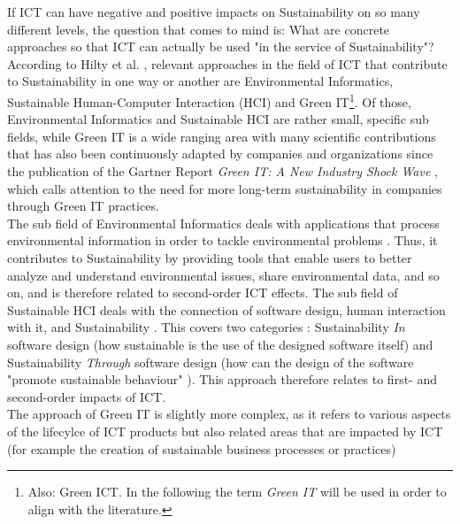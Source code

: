 \documentclass[oribibl]{llncs}
\begin{document}
If ICT can have negative and positive impacts on Sustainability on so many different levels, the question that comes to mind is: What are concrete approaches so that ICT can actually be used "in the service of Sustainability"\cite{hilty11}?\\
According to Hilty et al. \cite{hilty11}, relevant approaches in the field of ICT that contribute to Sustainability in one way or another  are Environmental Informatics, Sustainable Human-Computer Interaction (HCI) %
and Green IT\footnote{Also: Green ICT. In the following the term \textit{Green IT} will be used in order to align with the literature.}. %
Of those, Environmental Informatics and Sustainable HCI are rather small, specific sub fields, while Green IT is a wide ranging area with many scientific contributions that has also been continuously adapted by companies and organizations %
since the publication of the Gartner Report \textit{Green IT: A New Industry Shock Wave} \cite{gartner07}, which calls attention to the need for more long-term sustainability in companies through Green IT practices.\\ %
The sub field of Environmental Informatics deals with
applications that process environmental information in order to tackle environmental problems \cite{hilty11}. Thus, it contributes to Sustainability by providing tools that enable users to better analyze and understand environmental issues, share environmental data, and so on, and is therefore related to second-order ICT effects. The sub field of Sustainable HCI deals with the connection of software design, human interaction with it, and Sustainability \cite{hilty11}. This covers two categories \cite{hilty11}: Sustainability \textit{In} software design (how sustainable is the use of the designed software itself) and Sustainability \textit{Through} software design (how can the design of the software "promote sustainable behaviour" \cite{hilty11}). This approach therefore relates to first- and second-order impacts of ICT.\\
The approach of Green IT is slightly more complex, as it refers to various aspects of the lifecylce of ICT products but also related areas that are impacted by ICT (for example the creation of sustainable business processes or practices) %
\end{document}
